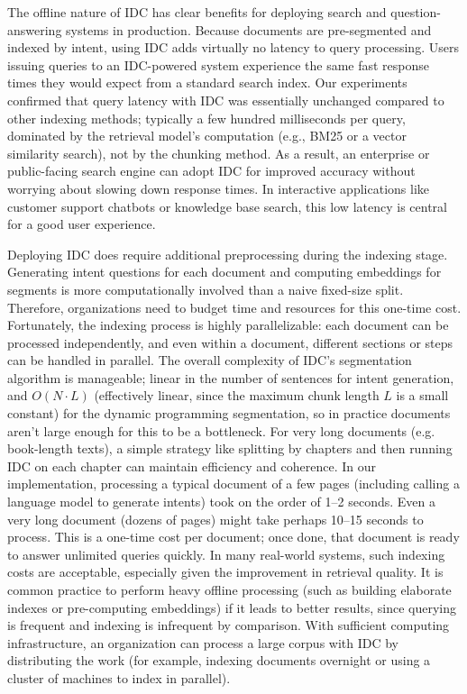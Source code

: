 \documentclass[12pt,a4paper]{report}
\begin{document}
The offline nature of IDC has clear benefits for deploying search and question-answering systems in production. Because documents are pre-segmented and indexed by intent, using IDC adds virtually no latency to query processing. Users issuing queries to an IDC-powered system experience the same fast response times they would expect from a standard search index. Our experiments confirmed that query latency with IDC was essentially unchanged compared to other indexing methods; typically a few hundred milliseconds per query, dominated by the retrieval model's computation (e.g., BM25 or a vector similarity search), not by the chunking method. As a result, an enterprise or public-facing search engine can adopt IDC for improved accuracy without worrying about slowing down response times. In interactive applications like customer support chatbots or knowledge base search, this low latency is central for a good user experience.

Deploying IDC does require additional preprocessing during the indexing stage. Generating intent questions for each document and computing embeddings for segments is more computationally involved than a naive fixed-size split. Therefore, organizations need to budget time and resources for this one-time cost. Fortunately, the indexing process is highly parallelizable: each document can be processed independently, and even within a document, different sections or steps can be handled in parallel. The overall complexity of IDC's segmentation algorithm is manageable; linear in the number of sentences for intent generation, and $O(N \cdot L)$ (effectively linear, since the maximum chunk length $L$ is a small constant) for the dynamic programming segmentation, so in practice documents aren't large enough for this to be a bottleneck. For very long documents (e.g. book-length texts), a simple strategy like splitting by chapters and then running IDC on each chapter can maintain efficiency and coherence. In our implementation, processing a typical document of a few pages (including calling a language model to generate intents) took on the order of 1--2 seconds. Even a very long document (dozens of pages) might take perhaps 10--15 seconds to process. This is a one-time cost per document; once done, that document is ready to answer unlimited queries quickly. In many real-world systems, such indexing costs are acceptable, especially given the improvement in retrieval quality. It is common practice to perform heavy offline processing (such as building elaborate indexes or pre-computing embeddings) if it leads to better results, since querying is frequent and indexing is infrequent by comparison. With sufficient computing infrastructure, an organization can process a large corpus with IDC by distributing the work (for example, indexing documents overnight or using a cluster of machines to index in parallel).
\end{document}
